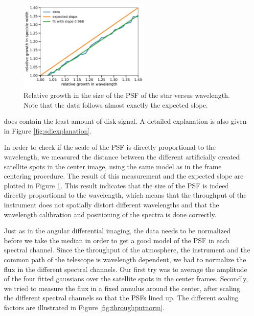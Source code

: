 \documentclass[twoside,single,12pt]{lion-msc}
\begin{document}
\begin{figure}
\centering
\includegraphics[width = 0.58\textwidth]{specklegrowth}
\caption{Relative growth in the size of the PSF of the star versus wavelength. Note that the data follows almost exactly the expected slope.}
\label{fig:specklegrowth}
\vspace*{-0.5cm}
\end{figure}

\noindent
does contain the least amount of disk signal. A detailed explanation is also given in Figure \ref{fig:sdiexplanation}.
\bigskip

In order to check if the scale of the PSF is directly proportional to the wavelength, we measured the distance between the different artificially created satellite spots in the center image, using the same model as in the frame centering procedure. The result of this measurement and the expected slope are plotted in Figure \ref{fig:specklegrowth}. This result indicates that the size of the PSF is indeed directly proportional to the wavelength, which means that the throughput of the instrument does not spatially distort different wavelengths and that the wavelength calibration and positioning of the spectra is done correctly.
\bigskip

Just as in the angular differential imaging, the data needs to be normalized before we take the median in order to get a good model of the PSF in each spectral channel. Since the throughput of the atmosphere, the instrument and the common path of the telescope is wavelength dependent, we had to normalize the flux in the different spectral channels. Our first try was to average the amplitude of the four fitted gaussians over the satellite spots in the center frames. Secondly, we tried to measure the flux in a fixed annulus around the center, after scaling the different spectral channels so that the PSFs lined up. The different scaling factors are illustrated in Figure \ref{fig:throughputnorm}.
\bigskip
\end{document}
